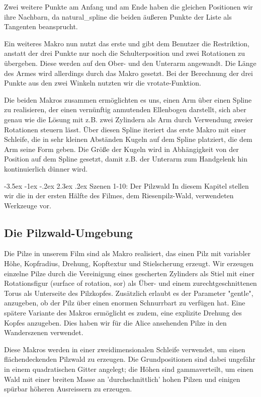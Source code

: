 \documentclass[twocolumn]{article}
\makeatletter
\renewcommand\section{\@startsection{section}{1}{\z@}%
                                      {-3.5ex \@plus -1ex \@minus -.2ex}%
                                      {2.3ex \@plus.2ex}%
                                      {\normalfont\large\bfseries}}
\makeatother
\begin{document}
Zwei weitere Punkte am Anfang und am Ende haben die gleichen Positionen wir ihre Nachbarn, da natural\_spline die beiden äußeren Punkte der Liste als Tangenten beansprucht. %

Ein weiteres Makro nun nutzt das erste und gibt dem Benutzer die Restriktion, anstatt der drei Punkte nur noch die Schulterposition und zwei Rotationen zu übergeben.
Diese werden auf den Ober- und den Unterarm angewandt. Die Länge des Armes wird allerdings durch das Makro gesetzt.
Bei der Berechnung der drei Punkte aus den zwei Winkeln nutzten wir die vrotate-Funktion.

Die beiden Makros zusammen ermöglichten es uns, einen Arm über einen Spline zu realisieren, der einen vernünftig anmutenden Ellenbogen darstellt, sich aber genau wie die Lösung mit z.B. zwei Zylindern als Arm durch Verwendung zweier Rotationen steuern lässt.
Über diesen Spline iteriert das erste Makro mit einer Schleife, die in sehr kleinen Abständen Kugeln auf dem Spline platziert, die dem Arm seine Form geben.
Die Größe der Kugeln wird in Abhängigkeit von der Position auf dem Spline gesetzt, damit z.B. der Unterarm zum Handgelenk hin kontinuierlich dünner wird.

\section{Szenen 1-10: Der Pilzwald}
In diesem Kapitel stellen wir die in der ersten Hälfte des Filmes, dem Riesenpilz-Wald, verwendeten Werkzeuge vor.

\subsection{Die Pilzwald-Umgebung}
Die Pilze in unserem Film sind als Makro realisiert, das einen Pilz mit variabler Höhe, Kopfradius, Drehung, Kopftextur und Stielscherung erzeugt. Wir erzeugen einzelne Pilze durch die Vereinigung eines gescherten Zylinders als Stiel mit einer Rotationsfigur (surface of rotation, sor) als Über- und einem zurechtgeschnittenen Torus als Unterseite des Pilzkopfes.
Zusätzlich erlaubt es der Parameter "gentle", anzugeben, ob der Pilz über einen enormen Schnurrbart zu verfügen hat.
Eine spätere Variante des Makros ermöglicht es zudem, eine explizite Drehung des Kopfes anzugeben. Dies haben wir für die Alice ansehenden Pilze in den Wanderszenen verwendet.

Diese Makros werden in einer zweidimensionalen Schleife verwendet, um einen flächendeckenden Pilzwald zu erzeugen. Die Grundpositionen sind dabei ungefähr in einem quadratischen Gitter angelegt; die Höhen sind gammaverteilt, um einen Wald mit einer breiten Masse an 'durchschnittlich' hohen Pilzen und einigen spürbar höheren Ausreissern zu erzeugen.
\end{document}
